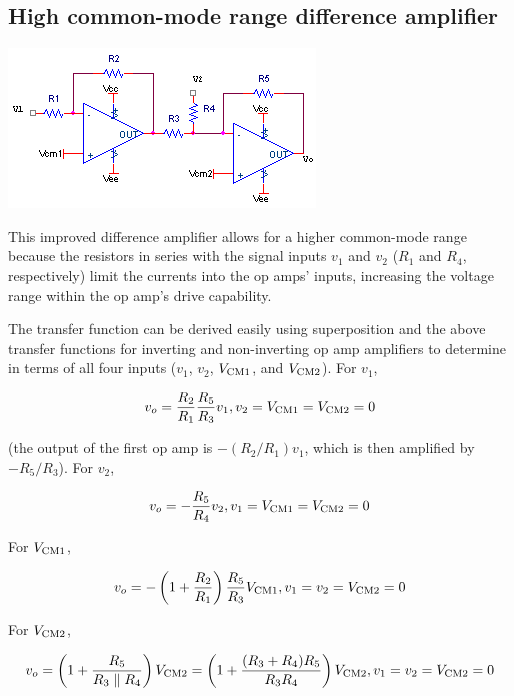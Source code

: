 \subsection{High common-mode range difference amplifier}
\begin{center}
	\includegraphics{schematics/highcmdifferenceamplifier.PNG}
\end{center}
This improved difference amplifier allows for a higher common-mode range because the resistors in series with the signal inputs $v_1$ and $v_2$ ($R_1$ and $R_4$, respectively) limit the currents into the op amps' inputs, increasing the voltage range within the op amp's drive capability. \autocite[418]{op-amps-for-everyone}

The transfer function can be derived easily using superposition and the above transfer functions for inverting and non-inverting op amp amplifiers to determine \vout in terms of all four inputs ($v_1$, $v_2$, $V_\mathrm{CM1}$, and $V_\mathrm{CM2}$).
For $v_1$,

\begin{equation}
\vout = \frac{R_2}{R_1}\frac{R_5}{R_3}v_1, v_2 = V\sub{CM1} = V\sub{CM2} = 0
\end{equation}

\noindent (the output of the first op amp is $-(R_2/R_1)v_1$, which is then amplified by $-R_5/R_3$).
For $v_2$,

\begin{equation}
\vout = -\frac{R_5}{R_4}v_2, v_1 = V\sub{CM1} = V\sub{CM2} = 0
\end{equation}

\noindent For $V_\mathrm{CM1}$,

\begin{equation}
\vout = -\left(1+\frac{R_2}{R_1}\right)\frac{R_5}{R_3}V\sub{CM1}, v_{1} = v_{2} = V\sub{CM2} = 0
\end{equation}

\noindent For $V_\mathrm{CM2}$,

\begin{equation}
\vout = \left(1+\frac{R_5}{R_3 \parallel R_4}\right)V\sub{CM2} = \left(1+\frac{(R_3+R_4)R_5}{R_3R_4}\right)V\sub{CM2}, v_1 = v_2 = V\sub{CM2} = 0
\end{equation}

